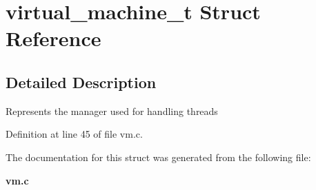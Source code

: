 \section{virtual\_\-machine\_\-t Struct Reference}
\label{structvirtual__machine__t}


\subsection{Detailed Description}
Represents the manager used for handling threads 

Definition at line 45 of file vm.c.



The documentation for this struct was generated from the following file:\begin{DoxyCompactItemize}
\item 
{\bf vm.c}\end{DoxyCompactItemize}
